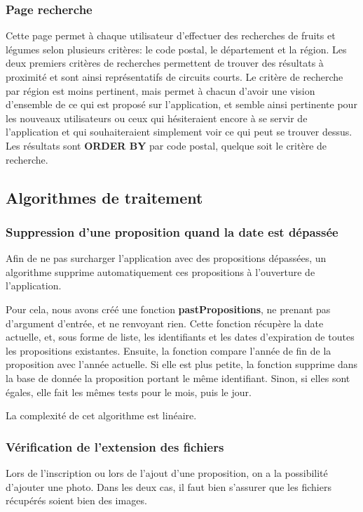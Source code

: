 \documentclass{article}
\begin{document}
\subsubsection{Page recherche}
Cette page permet à chaque utilisateur d'effectuer des recherches de fruits et légumes selon plusieurs critères: le code postal, le département et la région. Les deux premiers critères de recherches permettent de trouver des résultats à proximité et sont ainsi représentatifs de circuits courts. Le critère de recherche par région est moins pertinent, mais permet à chacun d'avoir une vision d'ensemble de ce qui est proposé sur l'application, et semble ainsi pertinente pour les nouveaux utilisateurs ou ceux qui hésiteraient encore à se servir de l'application et qui souhaiteraient simplement voir ce qui peut se trouver dessus.
Les résultats sont \textbf{ORDER BY} par code postal, quelque soit le critère de recherche.

\subsection{Algorithmes de traitement}
        \subsubsection{Suppression d'une proposition quand la date est dépassée}

Afin de ne pas surcharger l'application avec des propositions dépassées, un algorithme supprime automatiquement ces propositions à l'ouverture de l'application.

Pour cela, nous avons créé une fonction \textbf{pastPropositions}, ne prenant pas d'argument d'entrée, et ne renvoyant rien. Cette fonction récupère la date actuelle, et, sous forme de liste, les identifiants et les dates d'expiration de toutes les propositions existantes. Ensuite, la fonction compare l'année de fin de la proposition avec l'année actuelle. Si elle est plus petite, la fonction supprime dans la base de donnée la proposition portant le même identifiant. Sinon, si elles sont égales, elle fait les mêmes tests pour le mois, puis le jour.

La complexité de cet algorithme est linéaire.

        \subsubsection{Vérification de l'extension des fichiers}
Lors de l'inscription ou lors de l'ajout d'une proposition, on a la possibilité d'ajouter une photo. Dans les deux cas, il faut bien s'assurer que les fichiers récupérés soient bien des images.
\end{document}
